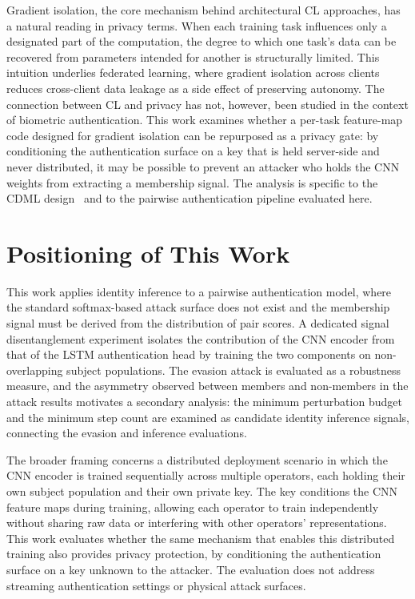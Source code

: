 Gradient isolation, the core mechanism behind architectural CL approaches, has a natural reading in privacy terms. When each training task influences only a designated part of the computation, the degree to which one task's data can be recovered from parameters intended for another is structurally limited. This intuition underlies federated learning, where gradient isolation across clients reduces cross-client data leakage as a side effect of preserving autonomy. The connection between CL and privacy has not, however, been studied in the context of biometric authentication. This work examines whether a per-task feature-map code designed for gradient isolation can be repurposed as a privacy gate: by conditioning the authentication surface on a key that is held server-side and never distributed, it may be possible to prevent an attacker who holds the CNN weights from extracting a membership signal. The analysis is specific to the CDML design~\cite{milani2024gait} and to the pairwise authentication pipeline evaluated here.

\section{Positioning of This Work}
\label{sec:rel_positioning}

This work applies identity inference to a pairwise authentication model, where the standard softmax-based attack surface does not exist and the membership signal must be derived from the distribution of pair scores. A dedicated signal disentanglement experiment isolates the contribution of the CNN encoder from that of the LSTM authentication head by training the two components on non-overlapping subject populations. The evasion attack is evaluated as a robustness measure, and the asymmetry observed between members and non-members in the attack results motivates a secondary analysis: the minimum perturbation budget and the minimum step count are examined as candidate identity inference signals, connecting the evasion and inference evaluations.

The broader framing concerns a distributed deployment scenario in which the CNN encoder is trained sequentially across multiple operators, each holding their own subject population and their own private key. The key conditions the CNN feature maps during training, allowing each operator to train independently without sharing raw data or interfering with other operators' representations. This work evaluates whether the same mechanism that enables this distributed training also provides privacy protection, by conditioning the authentication surface on a key unknown to the attacker. The evaluation does not address streaming authentication settings or physical attack surfaces.
